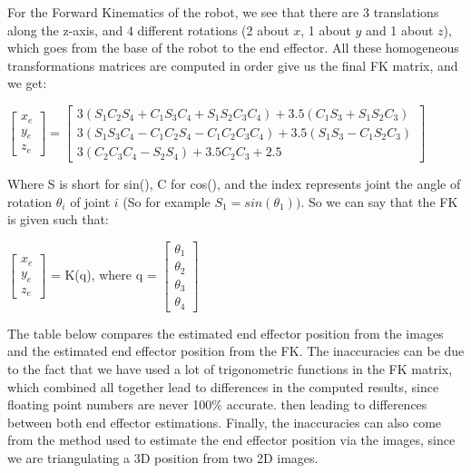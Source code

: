 \documentclass{article}
\begin{document}
For the Forward Kinematics of the robot, we see that there are 3 translations along the z-axis, and 4 different rotations (2 about $x$, 1 about $y$ and 1 about $z$), which goes from the base of the robot to the end effector. All these homogeneous transformations matrices  are computed in order give us the final FK matrix, and we get: \\
\begin{center}
    $\begin{bmatrix}
        x_e\\
        y_e\\
        z_e
    \end{bmatrix} 
    = 
    \begin{bmatrix}
        3(S_1C_2S_4 + C_1S_3C_4 + S_1S_2C_3C_4) + 3.5(C_1S_3 + S_1S_2C_3)\\
        3(S_1S_3C_4 - C_1C_2S_4 - C_1C_2C_3C_4) + 3.5(S_1S_3 - C_1S_2C_3)\\
        3(C_2C_3C_4 - S_2S_4) + 3.5C_2C_3 + 2.5
    \end{bmatrix}
    $
\end{center}

Where S is short for sin(), C for cos(), and the index represents joint the angle of rotation $\theta_i$ of joint $i$ (So for example $S_1 = sin(\theta_1))$. So we can say that the FK is given such that: \\ 
\begin{center}
    $\begin{bmatrix}
        x_e\\
        y_e\\
        z_e
    \end{bmatrix}$ 
    = K(q), where q = 
    $\begin{bmatrix}
        \theta_1 \\
        \theta_2 \\
        \theta_3 \\
        \theta_4
    \end{bmatrix}
    $
\end{center}

The table below compares the estimated end effector position from the images and the estimated end effector position from the FK. The inaccuracies can be due to the fact that we have used a lot of trigonometric functions in the FK matrix, which combined all together lead to differences in the computed results,
since floating point numbers are never 100\% accurate.
then leading to differences between both end effector estimations. Finally, the inaccuracies can also come from the method used to estimate the end effector position via the images, since we are triangulating a 3D position from two 2D images. \\
\end{document}
